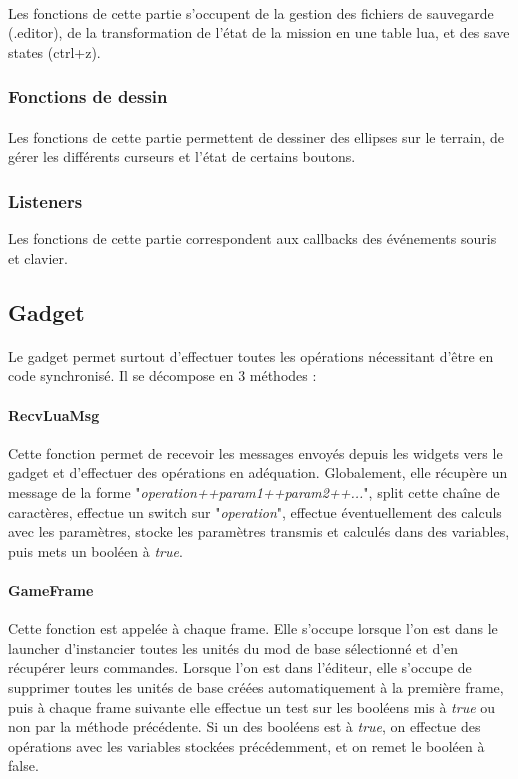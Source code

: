 \documentclass[a4paper]{article}
\begin{document}
\paragraph{ }
Les fonctions de cette partie s'occupent de la gestion des fichiers de sauvegarde (.editor), de la transformation de l'état de la mission en une table lua, et des save states (ctrl+z).
\subsubsection{Fonctions de dessin}
\paragraph{ }
Les fonctions de cette partie permettent de dessiner des ellipses sur le terrain, de gérer les différents curseurs et l'état de certains boutons.
\subsubsection{Listeners\label{listeners}}
Les fonctions de cette partie correspondent aux callbacks des événements souris et clavier.
\subsection{Gadget}
\paragraph{ }
Le gadget permet surtout d'effectuer toutes les opérations nécessitant d'être en code synchronisé. Il se décompose en 3 méthodes :
\paragraph{RecvLuaMsg} Cette fonction permet de recevoir les messages envoyés depuis les widgets vers le gadget et d'effectuer des opérations en adéquation. Globalement, elle récupère un message de la forme "\textit{operation++param1++param2++...}", split cette chaîne de caractères, effectue un switch sur "\textit{operation}", effectue éventuellement des calculs avec les paramètres, stocke les paramètres transmis et calculés dans des variables, puis mets un booléen à \textit{true}.
\paragraph{GameFrame} Cette fonction est appelée à chaque frame. Elle s'occupe lorsque l'on est dans le launcher d'instancier toutes les unités du mod de base sélectionné et d'en récupérer leurs commandes. Lorsque l'on est dans l'éditeur, elle s'occupe de supprimer toutes les unités de base créées automatiquement à la première frame, puis à chaque frame suivante elle effectue un test sur les booléens mis à \textit{true} ou non par la méthode précédente. Si un des booléens est à \textit{true}, on effectue des opérations avec les variables stockées précédemment, et on remet le booléen à false.
\end{document}
